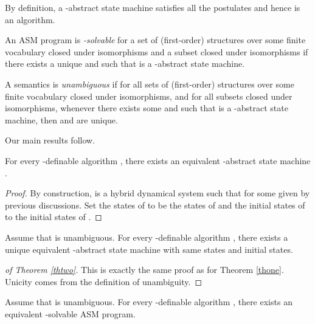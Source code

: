 \documentclass[envcountsame]{llncs}
\begin{document}
By definition, a  -abstract state machine  satisfies all the
postulates and hence is an algorithm.

\begin{definition}
An ASM program  is \emph{-solvable} for a set  of (first-order) structures over some finite
    vocabulary  closed under isomorphisms and a subset  closed under isomorphisms if there exists a unique
     and  such that  is a -abstract
    state machine.
\end{definition}


\begin{definition}
A semantics  is \emph{unambiguous} if for all sets  of (first-order) structures over some finite
    vocabulary  closed under isomorphisms, and for all subsets  closed under isomorphisms, whenever there exists some 
    and  such that  is a -abstract
    state machine, then  and  are unique.
\end{definition}

Our main results follow.


\begin{theorem} \label{thone}
  For every -definable algorithm , there exists an equivalent -abstract state machine .
\end{theorem}


\begin{proof}By construction,  is a hybrid dynamical
  system such that  for some  given by
  previous discussions. Set the states of  to be the
  states of  and the initial states of
   to the initial states of .
\end{proof}





\begin{theorem} \label{thtwo}
  Assume that  is unambiguous.
For every -definable algorithm , there exists a unique equivalent -abstract
  state machine  with same states and initial states.
\end{theorem}



\begin{proof}[of Theorem \ref{thtwo}]
This is exactly the same proof as for Theorem \ref{thone}. Unicity comes from the definition of
unambiguity.
\end{proof}




\begin{corollary} \label{coromain}
Assume that  is unambiguous.
For every -definable algorithm , there exists an equivalent -solvable ASM
  program.
\end{corollary}
\end{document}
